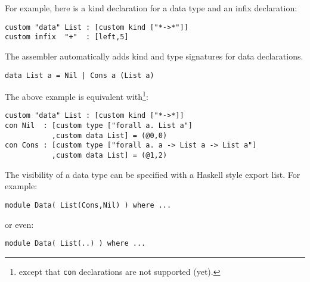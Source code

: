 \documentclass[a4paper,dvips]{article}
\newcommand{\term}[1]{{\tt #1}}
\begin{document}
For example, here is a kind declaration for a data type and an infix declaration:
\begin{verbatim}
custom "data" List : [custom kind ["*->*"]]
custom infix  "+"  : [left,5]
\end{verbatim}

The assembler automatically adds kind and type signatures for data
declarations. 
\begin{verbatim}
data List a = Nil | Cons a (List a)
\end{verbatim}

The above example is equivalent with\footnote{except that \term{con} declarations
are not supported (yet).}:
\begin{verbatim}
custom "data" List : [custom kind ["*->*]]
con Nil  : [custom type ["forall a. List a"]
           ,custom data List] = (@0,0)
con Cons : [custom type ["forall a. a -> List a -> List a"]
           ,custom data List] = (@1,2)
\end{verbatim}

The visibility of a data type can be specified with a Haskell style
export list. For example:
\begin{verbatim}
module Data( List(Cons,Nil) ) where ...
\end{verbatim}

or even:
\begin{verbatim}
module Data( List(..) ) where ...
\end{verbatim}
\end{document}
